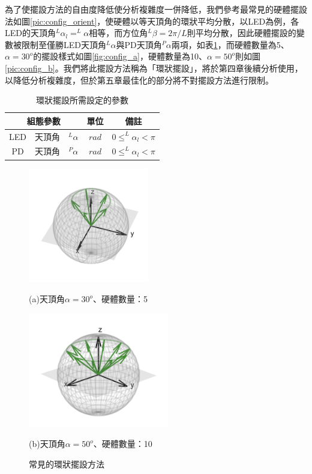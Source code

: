 為了使擺設方法的自由度降低使分析複雜度一併降低，我們參考最常見的硬體擺設法如圖\ref{pic:config_orient}，使硬體以等天頂角的環狀平均分散，以LED為例，各LED的天頂角$^L\alpha_l = ^L\alpha$相等，而方位角$^L\beta = 2\pi/L$則平均分散，因此硬體擺設的變數被限制至僅勝LED天頂角$^L\alpha$與PD天頂角$^P\alpha$兩項，如表\ref{tab:para_restrict_config}，而硬體數量為5、$\alpha=30^o$的擺設樣式如圖\ref{fig:config_a}，硬體數量為10、$\alpha=50^o$則如圖\ref{pic:config_b}。我們將此擺設方法稱為「環狀擺設」，將於第四章後續分析使用，以降低分析複雜度，但於第五章最佳化的部分將不對擺設方法進行限制。

\begin{table}[htpb]
    \caption{環狀擺設所需設定的參數}
    \label{tab:para_restrict_config}
    \centering
    \begin{tabular}{|c|cc|c|c|}
    \hline
    \multicolumn{3}{|c|}{\textbf{組態參數}}  &\textbf{單位}  &  \textbf{備註}   \\
    \hline
    {LED} 
    & 天頂角 &$^L \alpha$ & $rad$ & $0\leq ^L \alpha_l<\pi$ \\\hline
    {PD} 
    & 天頂角 &$^P \alpha$ & $rad$ & $0\leq ^L \alpha_l<\pi$ \\\hline

    \end{tabular}
\end{table}

\begin{figure}[htpb]
    \centering
    \begin{minipage}{.5\textwidth}
        \centering
        \includegraphics[height=5cm]{ch4pic/config_a.png}
        \captionsetup{labelformat=empty}
        \caption*{(a)天頂角$\alpha=30^o$、硬體數量：5}
        \label{fig:config_a}
    \end{minipage}%
    \begin{minipage}{0.5\textwidth}
        \centering
        \includegraphics[height=5cm]{ch4pic/config_b.png}
        \captionsetup{labelformat=empty}
        \caption*{(b)天頂角$\alpha=50^o$、硬體數量：10}
        \label{fig:config_b}
    \end{minipage}
    \caption{常見的環狀擺設方法}
\end{figure}



